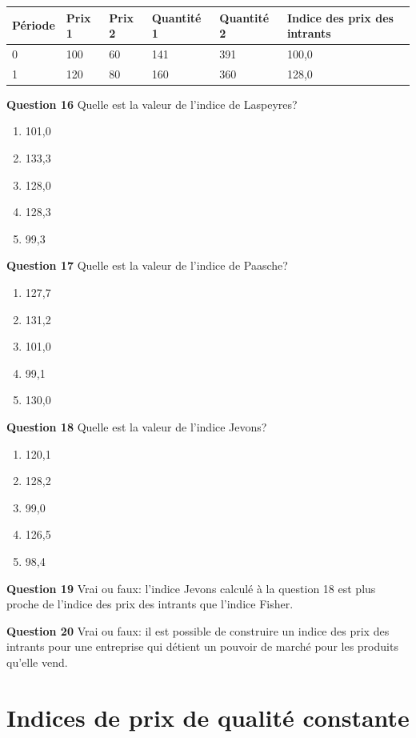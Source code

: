 \documentclass[
]{article}
\begin{document}
\begin{longtable}[]{@{}llllll@{}}
\toprule
Période & Prix 1 & Prix 2 & Quantité 1 & Quantité 2 & Indice des prix des intrants \\
\midrule
\endhead
0 & 100 & 60 & 141 & 391 & 100,0 \\
1 & 120 & 80 & 160 & 360 & 128,0 \\
\bottomrule
\end{longtable}

\textbf{Question 16} Quelle est la valeur de l'indice de Laspeyres?

\begin{enumerate}
\def\labelenumi{\alph{enumi})}
\item
  101,0
\item
  133,3
\item
  128,0
\item
  128,3
\item
  99,3
\end{enumerate}

\textbf{Question 17} Quelle est la valeur de l'indice de Paasche?

\begin{enumerate}
\def\labelenumi{\alph{enumi})}
\item
  127,7
\item
  131,2
\item
  101,0
\item
  99,1
\item
  130,0
\end{enumerate}

\textbf{Question 18} Quelle est la valeur de l'indice Jevons?

\begin{enumerate}
\def\labelenumi{\alph{enumi})}
\item
  120,1
\item
  128,2
\item
  99,0
\item
  126,5
\item
  98,4
\end{enumerate}

\textbf{Question 19} Vrai ou faux: l'indice Jevons calculé à la question 18 est plus proche de l'indice des prix des intrants que l'indice Fisher.

\textbf{Question 20} Vrai ou faux: il est possible de construire un indice des prix des intrants pour une entreprise qui détient un pouvoir de marché pour les produits qu'elle vend.

\hypertarget{part-indices-de-prix-de-qualituxe9-constante}{%
\part{Indices de prix de qualité constante}\label{part-indices-de-prix-de-qualituxe9-constante}}
\end{document}
